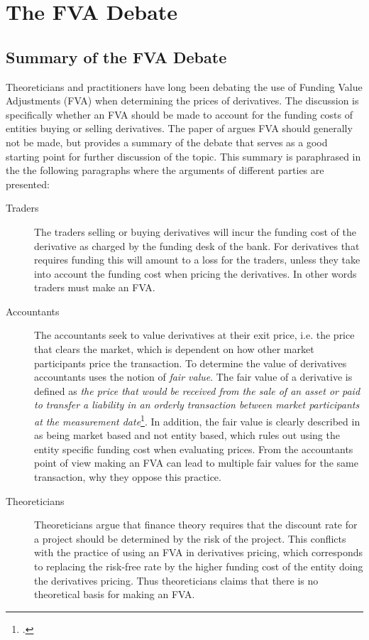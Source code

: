 \documentclass[../main.tex]{subfiles}
\begin{document}
    \section{The FVA Debate}

    \subsection{Summary of the FVA Debate}
        Theoreticians and practitioners have long been debating the use of Funding Value Adjustments (FVA) when determining the prices of derivatives. The discussion is specifically whether an FVA should be made to account for the funding costs of entities buying or selling derivatives. The paper of \cite{HullWhiteFVA} argues FVA should generally not be made, but provides a summary of the debate that serves as a good starting point for further discussion of the topic. This summary is paraphrased in the the following paragraphs where the arguments of different parties are presented:

        \begin{description}
            \item[Traders] The traders selling or buying derivatives will incur the funding cost of the derivative as charged by the funding desk of the bank. For derivatives that requires funding this will amount to a loss for the traders, unless they take into account the funding cost when pricing the derivatives. In other words traders must make an FVA. 
            \item[Accountants] The accountants seek to value derivatives at their exit price, i.e. the price that clears the market, which is dependent on how other market participants price the transaction. To determine the value of derivatives accountants uses the notion of \textit{fair value}. The fair value of a derivative is defined as \textit{the price that would be received from the sale of an asset or paid to transfer a liability in an orderly transaction between market participants at the measurement date}\footcite{IFRS13}. In addition, the fair value is clearly described in \cite{IFRS13} as being market based and not entity based, which rules out using the entity specific funding cost when evaluating prices. From the accountants point of view making an FVA can lead to multiple fair values for the same transaction, why they oppose this practice.
            \item[Theoreticians] Theoreticians argue that finance theory requires that the discount rate for a project should be determined by the risk of the project. This conflicts with the practice of using an FVA in derivatives pricing, which corresponds to replacing the risk-free rate by the higher funding cost of the entity doing the derivatives pricing. Thus theoreticians claims that there is no theoretical basis for making an FVA.
        \end{description}
\end{document}
